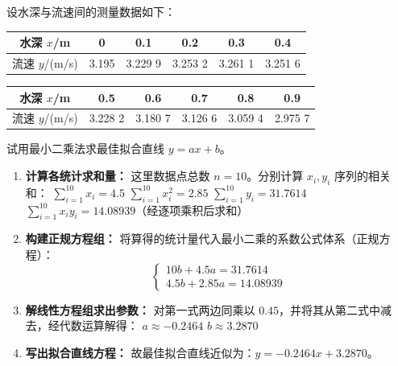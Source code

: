 \documentclass[lang=cn,11pt]{elegantbook}
\begin{document}
\begin{exercise}[利用最小二乘法进行线性拟合]
设水深与流速间的测量数据如下：
\begin{center}
\begin{tabular}{|c|c|c|c|c|c|}
\hline
水深 $x$/m & 0 & 0.1 & 0.2 & 0.3 & 0.4 \\
\hline
流速 $y$/(m/s) & 3.195 & 3.229 9 & 3.253 2 & 3.261 1 & 3.251 6 \\
\hline
\end{tabular}
\vspace{0.5em}
\begin{tabular}{|c|c|c|c|c|c|}
\hline
水深 $x$/m & 0.5 & 0.6 & 0.7 & 0.8 & 0.9 \\
\hline
流速 $y$/(m/s) & 3.228 2 & 3.180 7 & 3.126 6 & 3.059 4 & 2.975 7 \\
\hline
\end{tabular}
\end{center}
试用最小二乘法求最佳拟合直线 $y=ax+b$。
\end{exercise}
\begin{solution}
\begin{enumerate}
  \item \textbf{计算各统计求和量：}
  这里数据点总数 $n=10$。分别计算 $x_i, y_i$ 序列的相关和：
  $\sum_{i=1}^{10} x_i = 4.5$
  $\sum_{i=1}^{10} x_i^2 = 2.85$
  $\sum_{i=1}^{10} y_i = 31.7614$
  $\sum_{i=1}^{10} x_i y_i = 14.08939$（经逐项乘积后求和）

  \item \textbf{构建正规方程组：}
  将算得的统计量代入最小二乘的系数公式体系（正规方程）：
  \[
  \begin{cases}
  10b + 4.5a = 31.7614 \\
  4.5b + 2.85a = 14.08939
  \end{cases}
  \]

  \item \textbf{解线性方程组求出参数：}
  对第一式两边同乘以 $0.45$，并将其从第二式中减去，经代数运算解得：
  $a \approx -0.2464$
  $b \approx 3.2870$
  
  \item \textbf{写出拟合直线方程：}
  故最佳拟合直线近似为：$\boxed{y = -0.2464x + 3.2870}$。
\end{enumerate}
\end{solution}
\end{document}
